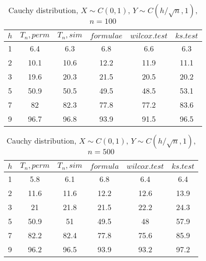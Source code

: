 \documentclass{svproc}
\begin{document}
\begin{table}
  \caption{Cauchy distribution, $X\sim C(0,1)$, $Y\sim C(h/\sqrt{n},1)$, $n=100$}
  \begin{center}
  \begin{tabular}{c@{\quad}c@{\quad}c@{\quad}c@{\quad}c@{\quad}c}
  \hline
  $h$ & $T_n, perm$ & $T_n, sim$ & $formulae$ & $wilcox.test$ & $ks.test$ \\
  \hline
  1 & 6.4 & 6.3 & 6.8 & 6.6 & 6.3 \\
  2 & 10.1 & 10.6 & 12.2 & 11.9 & 11.1 \\
  3 & 19.6 & 20.3 & 21.5 & 20.5 & 20.2 \\
  5 & 50.9 & 50.5 & 49.5 & 48.5 & 53.1 \\
  7 & 82 & 82.3 & 77.8 & 77.2 & 83.6 \\
  9 & 96.7 & 96.8 & 93.9 & 91.5 & 96.5 \\
  \hline
  \end{tabular}
  \end{center}
\end{table}

\begin{table}
  \caption{Cauchy distribution, $X\sim C(0,1)$, $Y\sim C(h/\sqrt{n},1)$, $n=500$}
  \begin{center}
  \begin{tabular}{c@{\quad}c@{\quad}c@{\quad}c@{\quad}c@{\quad}c}
  \hline
  $h$ & $T_n, perm$ & $T_n, sim$ & $formula$ & $wilcox.test$ & $ks.test$ \\
  \hline
  1 & 5.8   & 6.1      & 6.8       & 6.4           & 6.4       \\
  2 & 11.6  & 11.6     & 12.2      & 12.6          & 13.9      \\
  3 & 21    & 21.8     & 21.5      & 22.2          & 24.3      \\
  5 & 50.9  & 51       & 49.5      & 48            & 57.9      \\
  7 & 82.2  & 82.4     & 77.8      & 75.6          & 85.9      \\
  9 & 96.2  & 96.5     & 93.9      & 93.2          & 97.2      \\
  \hline
  \end{tabular}
  \end{center}
\end{table}
\end{document}
